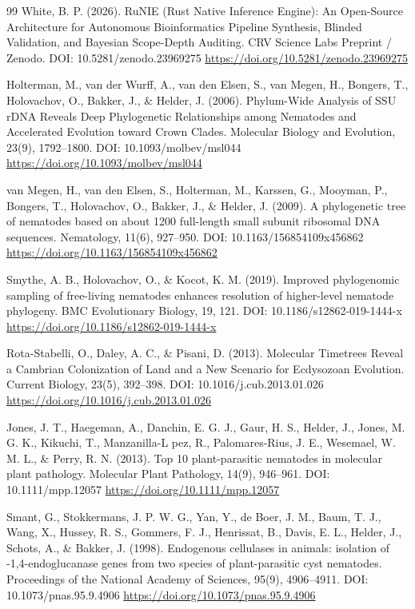 \documentclass[10pt,letterpaper]{article}
\begin{document}
\begin{thebibliography}{99}
 White, B. P. (2026). RuNIE (Rust Native Inference Engine): An Open-Source Architecture for Autonomous Bioinformatics Pipeline Synthesis, Blinded Validation, and Bayesian Scope-Depth Auditing. CRV Science Labs Preprint / Zenodo. DOI: 10.5281/zenodo.23969275 \url{https://doi.org/10.5281/zenodo.23969275}

 Holterman, M., van der Wurff, A., van den Elsen, S., van Megen, H., Bongers, T., Holovachov, O., Bakker, J., \& Helder, J. (2006). Phylum-Wide Analysis of SSU rDNA Reveals Deep Phylogenetic Relationships among Nematodes and Accelerated Evolution toward Crown Clades. Molecular Biology and Evolution, 23(9), 1792--1800. DOI: 10.1093/molbev/msl044 \url{https://doi.org/10.1093/molbev/msl044}

 van Megen, H., van den Elsen, S., Holterman, M., Karssen, G., Mooyman, P., Bongers, T., Holovachov, O., Bakker, J., \& Helder, J. (2009). A phylogenetic tree of nematodes based on about 1200 full-length small subunit ribosomal DNA sequences. Nematology, 11(6), 927--950. DOI: 10.1163/156854109x456862 \url{https://doi.org/10.1163/156854109x456862}

 Smythe, A. B., Holovachov, O., \& Kocot, K. M. (2019). Improved phylogenomic sampling of free-living nematodes enhances resolution of higher-level nematode phylogeny. BMC Evolutionary Biology, 19, 121. DOI: 10.1186/s12862-019-1444-x \url{https://doi.org/10.1186/s12862-019-1444-x}

 Rota-Stabelli, O., Daley, A. C., \& Pisani, D. (2013). Molecular Timetrees Reveal a Cambrian Colonization of Land and a New Scenario for Ecdysozoan Evolution. Current Biology, 23(5), 392--398. DOI: 10.1016/j.cub.2013.01.026 \url{https://doi.org/10.1016/j.cub.2013.01.026}

 Jones, J. T., Haegeman, A., Danchin, E. G. J., Gaur, H. S., Helder, J., Jones, M. G. K., Kikuchi, T., Manzanilla-L pez, R., Palomares-Rius, J. E., Wesemael, W. M. L., \& Perry, R. N. (2013). Top 10 plant-parasitic nematodes in molecular plant pathology. Molecular Plant Pathology, 14(9), 946--961. DOI: 10.1111/mpp.12057 \url{https://doi.org/10.1111/mpp.12057}

 Smant, G., Stokkermans, J. P. W. G., Yan, Y., de Boer, J. M., Baum, T. J., Wang, X., Hussey, R. S., Gommers, F. J., Henrissat, B., Davis, E. L., Helder, J., Schots, A., \& Bakker, J. (1998). Endogenous cellulases in animals: isolation of  -1,4-endoglucanase genes from two species of plant-parasitic cyst nematodes. Proceedings of the National Academy of Sciences, 95(9), 4906--4911. DOI: 10.1073/pnas.95.9.4906 \url{https://doi.org/10.1073/pnas.95.9.4906}


\end{thebibliography}
\end{document}
